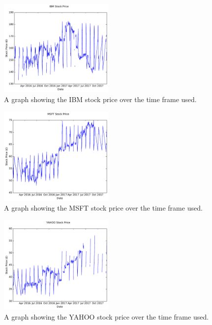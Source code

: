 \documentclass[conference]{IEEEtran}
\begin{document}
\begin{figure}
\includegraphics[width=0.5\textwidth, angle=0]{IBM.pdf}
\caption{A graph showing the IBM stock price over the time frame used.}
\label{fig:IBM Stock Price}
\end{figure}

\begin{figure}
\includegraphics[width=0.5\textwidth, angle=0]{MSFT.pdf}
\caption{A graph showing the MSFT stock price over the time frame used.}
\label{fig:MSFT Stock Price}
\end{figure}

\begin{figure}
\includegraphics[width=0.5\textwidth, angle=0]{YAHOO.pdf}
\caption{A graph showing the YAHOO stock price over the time frame used.}
\label{fig:YAHOO Stock Price}
\end{figure}
\end{document}
